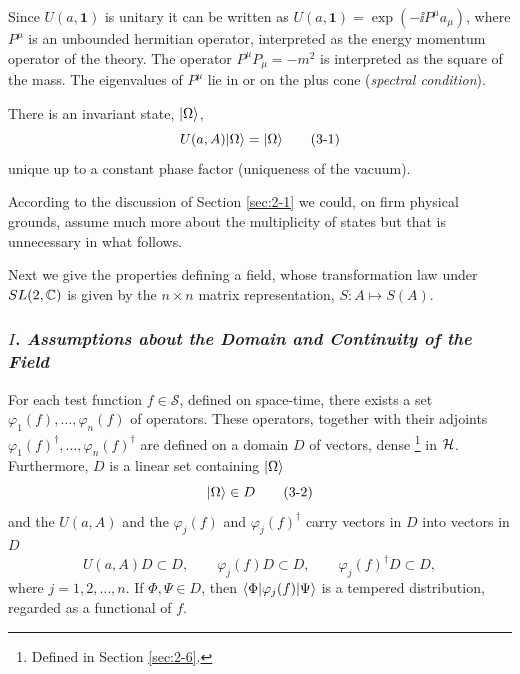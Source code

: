 Since $U(a,\mathbf{1})$ is unitary it can be written as
$U(a,\mathbf{1})=\exp(-\ii P^\mu a_\mu)$, where $P^\mu$ is an unbounded
hermitian operator, interpreted as the energy momentum operator of the
theory. The operator $P^\mu P_\mu=-m^2$ is interpreted as the square of the
mass. The eigenvalues of $P^\mu$ lie in or on the plus cone (\emph{spectral
condition}).

There is an invariant state, $\lvert \Omega\rangle$,
\begin{equation}
  U(a,A)\lvert \Omega\rangle=\lvert \Omega\rangle
  \tag{3-1}\label{eq:ch3-vacuum-invariant}
\end{equation}
unique up to a constant phase factor (uniqueness of the vacuum).

According to the discussion of Section \ref{sec:2-1} we could, on firm physical
grounds, assume much more about the multiplicity of states but that is
unnecessary in what follows.

Next we give the properties defining a field, whose transformation law under
$SL(2,\mathbb{C})$ is given by the $n\times n$ matrix representation,
$S:A\mapsto S(A)$.

\subsubsection*{$I$. \emph{Assumptions about the Domain and Continuity of the Field}}

For each test function $f\in\mathcal{S}$, defined on space-time, there
exists a set $\varphi_1(f),\ldots,\varphi_n(f)$ of operators. These
operators, together with their adjoints $\varphi_1(f)^\dagger,\ldots,
\varphi_n(f)^\dagger$ are defined on a domain $D$ of vectors, dense
\begingroup
\renewcommand{\thefootnote}{$\dagger$}%
\footnote{Defined in Section \ref{sec:2-6}.}%
\endgroup
in $\mathcal{H}$. Furthermore, $D$ is a linear set containing $\lvert \Omega\rangle$
\begin{equation}
  \lvert \Omega\rangle\in D
  \tag{3-2}\label{eq:ch3-domain-vacuum}
\end{equation}
and the $U(a,A)$ and the $\varphi_j(f)$ and $\varphi_j(f)^\dagger$ carry
vectors in $D$ into vectors in $D$
\begin{equation}
  U(a,A)D\subset D,\qquad
  \varphi_j(f)D\subset D,\qquad
  \varphi_j(f)^\dagger D\subset D,
  \tag{3-3}\label{eq:ch3-domain-invariance}
\end{equation}
where $j=1,2,\ldots,n$. If $\Phi,\Psi\in D$, then
$\langle \Phi\rvert\varphi_j(f)\lvert \Psi\rangle$ is a tempered distribution, regarded as
a functional of $f$.

